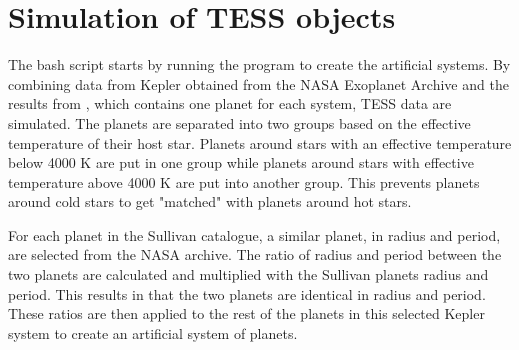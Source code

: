 \documentclass[12pt]{report}
\begin{document}
\section{Simulation of TESS objects}
\label{simTESS}
	The bash script starts by running the program to create the artificial systems. By combining data from Kepler obtained from the NASA Exoplanet Archive and the results from \cite{2015ApJ...809...77S}, which contains one planet for each system, TESS data are simulated. The planets are separated into two groups based on the effective temperature of their host star. Planets around stars with an effective temperature below 4000 K are put in one group while planets around stars with effective temperature above 4000 K are put into another group. This prevents planets around cold stars to get "matched" with planets around hot stars. 
	
	For each planet in the Sullivan catalogue, a similar planet, in radius and period, are selected from the NASA archive. The ratio of radius and period between the two planets are calculated and multiplied with the Sullivan planets radius and period. This results in that the two planets are identical in radius and period. These ratios are then applied to the rest of the planets in this selected Kepler system to create an artificial system of planets.  
	
\end{document}
